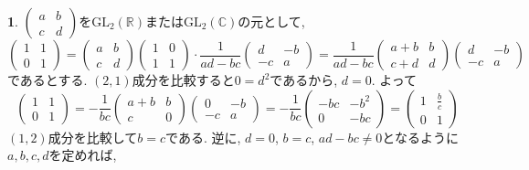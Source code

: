 \documentclass{article}
\theoremstyle{definition}
\newtheorem{ans}{}
\numberwithin{ans}{subsection}
\begin{document}
\begin{ans}
  $\begin{pmatrix}
    a & b \\
    c & d
  \end{pmatrix}$を$\mathrm{GL}_2(\mathbb{R})$または$\mathrm{GL}_2(\mathbb{C})$の元として,
  \[
    \begin{pmatrix}
      1 & 1 \\
      0 & 1
    \end{pmatrix} = \begin{pmatrix}
      a & b \\
      c & d
    \end{pmatrix} \begin{pmatrix}
      1 & 0 \\
      1 & 1
    \end{pmatrix} \cdot \frac{1}{ad - bc} \begin{pmatrix}
      d & -b \\
      -c & a
    \end{pmatrix} = \frac{1}{ad - bc} \begin{pmatrix}
      a + b & b \\
      c + d & d
    \end{pmatrix} \begin{pmatrix}
      d & -b \\
      -c & a
    \end{pmatrix}
  \]
  であるとする. $(2, 1)$成分を比較すると$0 = d^2$であるから, $d = 0$.
  よって
  \[
    \begin{pmatrix}
      1 & 1 \\
      0 & 1
    \end{pmatrix} = - \frac{1}{bc} \begin{pmatrix}
      a + b & b \\
      c & 0
    \end{pmatrix} \begin{pmatrix}
      0 & -b \\
      -c & a
    \end{pmatrix} = - \frac{1}{bc} \begin{pmatrix}
      -bc & -b^2 \\
      0 & -bc
    \end{pmatrix} = \begin{pmatrix}
      1 & \frac{b}{c} \\
      0 & 1
    \end{pmatrix}
  \]
  $(1, 2)$成分を比較して$b = c$である.
  逆に, $d = 0$, $b = c$, $ad - bc \neq 0$となるように$a, b, c, d$を定めれば,

\end{ans}
\end{document}
